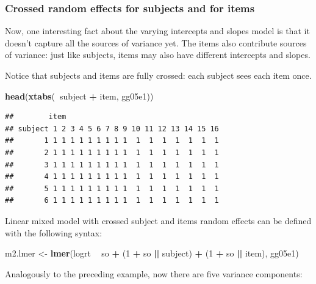 \documentclass[12pt,]{krantz}
\newenvironment{Shaded}{\begin{snugshade}}{\end{snugshade}}
\newcommand{\DecValTok}[1]{\textcolor[rgb]{0.00,0.00,0.81}{#1}}
\newcommand{\KeywordTok}[1]{\textcolor[rgb]{0.13,0.29,0.53}{\textbf{#1}}}
\newcommand{\NormalTok}[1]{#1}
\newcommand{\OperatorTok}[1]{\textcolor[rgb]{0.81,0.36,0.00}{\textbf{#1}}}
\newcommand{\StringTok}[1]{\textcolor[rgb]{0.31,0.60,0.02}{#1}}
\begin{document}
\hypertarget{crossed-random-effects-for-subjects-and-for-items}{%
\subsubsection{Crossed random effects for subjects and for items}\label{crossed-random-effects-for-subjects-and-for-items}}

Now, one interesting fact about the varying intercepts and slopes model is that it doesn't capture all the sources of variance yet. The items also contribute sources of variance: just like subjects, items may also have different intercepts and slopes.

Notice that subjects and items are fully crossed: each subject sees each item once.

\begin{Shaded}
\begin{Highlighting}[]
\KeywordTok{head}\NormalTok{(}\KeywordTok{xtabs}\NormalTok{(}\OperatorTok{~}\NormalTok{subject }\OperatorTok{+}\StringTok{ }\NormalTok{item, gg05e1))}
\end{Highlighting}
\end{Shaded}

\begin{verbatim}
##        item
## subject 1 2 3 4 5 6 7 8 9 10 11 12 13 14 15 16
##       1 1 1 1 1 1 1 1 1 1  1  1  1  1  1  1  1
##       2 1 1 1 1 1 1 1 1 1  1  1  1  1  1  1  1
##       3 1 1 1 1 1 1 1 1 1  1  1  1  1  1  1  1
##       4 1 1 1 1 1 1 1 1 1  1  1  1  1  1  1  1
##       5 1 1 1 1 1 1 1 1 1  1  1  1  1  1  1  1
##       6 1 1 1 1 1 1 1 1 1  1  1  1  1  1  1  1
\end{verbatim}

Linear mixed model with crossed subject and items random effects can be defined with the following syntax:

\begin{Shaded}
\begin{Highlighting}[]
\NormalTok{m2.lmer <-}\StringTok{ }\KeywordTok{lmer}\NormalTok{(logrt }\OperatorTok{~}\StringTok{ }\NormalTok{so }\OperatorTok{+}\StringTok{ }\NormalTok{(}\DecValTok{1} \OperatorTok{+}\StringTok{ }\NormalTok{so }\OperatorTok{||}\StringTok{ }\NormalTok{subject) }\OperatorTok{+}\StringTok{ }
\StringTok{  }\NormalTok{(}\DecValTok{1} \OperatorTok{+}\StringTok{ }\NormalTok{so }\OperatorTok{||}\StringTok{ }\NormalTok{item), gg05e1)}
\end{Highlighting}
\end{Shaded}

Analogously to the preceding example, now there are five variance components:
\end{document}
